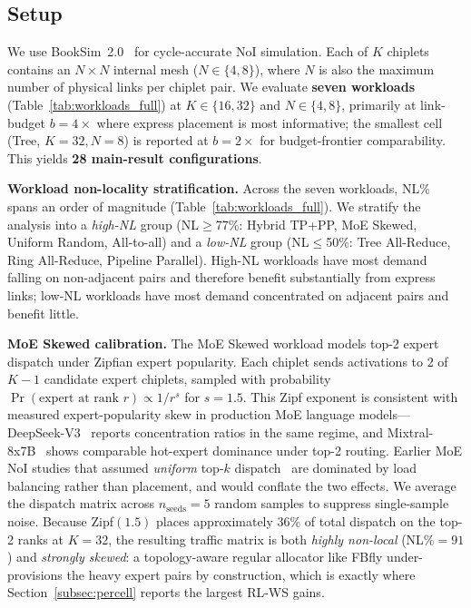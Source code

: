 \documentclass[conference]{IEEEtran}
\begin{document}
\subsection{Setup}

We use BookSim~2.0~\cite{booksim} for cycle-accurate NoI simulation. Each of $K$ chiplets contains an $N \times N$ internal mesh ($N \in \{4,8\}$), where $N$ is also the maximum number of physical links per chiplet pair. We evaluate \textbf{seven workloads} (Table~\ref{tab:workloads_full}) at $K\!\in\!\{16,32\}$ and $N\!\in\!\{4,8\}$, primarily at link-budget $b{=}4\times$ where express placement is most informative; the smallest cell (Tree, $K{=}32, N{=}8$) is reported at $b{=}2\times$ for budget-frontier comparability. This yields \textbf{28 main-result configurations}.

\textbf{Workload non-locality stratification.} Across the seven workloads, NL\% spans an order of magnitude (Table~\ref{tab:workloads_full}). We stratify the analysis into a \textit{high-NL} group (NL$\ge$77\%: Hybrid TP+PP, MoE Skewed, Uniform Random, All-to-all) and a \textit{low-NL} group (NL$\le$50\%: Tree All-Reduce, Ring All-Reduce, Pipeline Parallel). High-NL workloads have most demand falling on non-adjacent pairs and therefore benefit substantially from express links; low-NL workloads have most demand concentrated on adjacent pairs and benefit little.

\textbf{MoE Skewed calibration.} The MoE Skewed workload models top-2 expert dispatch under Zipfian expert popularity. Each chiplet sends activations to 2 of $K{-}1$ candidate expert chiplets, sampled with probability $\Pr(\text{expert at rank } r) \propto 1/r^{s}$ for $s{=}1.5$. This Zipf exponent is consistent with measured expert-popularity skew in production MoE language models---DeepSeek-V3~\cite{deepseekv3} reports concentration ratios in the same regime, and Mixtral-8x7B~\cite{mixtral} shows comparable hot-expert dominance under top-2 routing. Earlier MoE NoI studies that assumed \textit{uniform} top-$k$ dispatch~\cite{gshard} are dominated by load balancing rather than placement, and would conflate the two effects. We average the dispatch matrix across $n_\text{seeds}{=}5$ random samples to suppress single-sample noise. Because Zipf$(1.5)$ places approximately 36\% of total dispatch on the top-2 ranks at $K{=}32$, the resulting traffic matrix is both \textit{highly non-local} (NL\%${=}91$) and \textit{strongly skewed}: a topology-aware regular allocator like FBfly under-provisions the heavy expert pairs by construction, which is exactly where Section~\ref{subsec:percell} reports the largest RL-WS gains.
\end{document}
